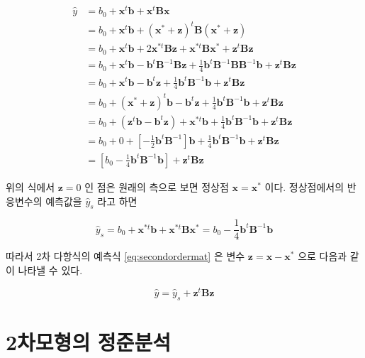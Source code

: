 \documentclass[
]{book}
\newcommand{\bm}[1]{\boldsymbol{\mathbf{#1}}}
\theoremstyle{definition}
\theoremstyle{definition}
\theoremstyle{definition}
\theoremstyle{definition}
\theoremstyle{remark}
\begin{document}
\begin{align*}
\hat y  & =   b_0 + {\bm x}^t \bm b + {\bm x}^t \bm B {\bm x}  \\
  & =  b_0  + {\bm x}^t \bm b +  ({\bm x}^* + \bm z )^t \bm B ({\bm x}^* + \bm z ) \\
  & =  b_0  + {\bm x}^t \bm b + 2 {\bm x}^{*t}  \bm B  \bm z  + {\bm x}^{*t}  \bm B {\bm x}^{*} +  {\bm z}^t \bm B  {\bm z} \\
   & =  b_0  + {\bm x}^t \bm b - {\bm b}^t  {\bm B}^{-1}  \bm B  \bm z  +\frac{1}{4} {\bm b}^t  {\bm B}^{-1} \bm B {\bm B}^{-1} {\bm b} +  {\bm z}^t \bm B  {\bm z} \\
   & = b_0  + {\bm x}^t \bm b  - {\bm b}^t  \bm z +\frac{1}{4}  {\bm b}^t {\bm B}^{-1}{\bm b} +  {\bm z}^t \bm B  {\bm z} \\
   & = b_0  + ({\bm x}^* + \bm z)^t \bm b  - {\bm b}^t  \bm z +\frac{1}{4}  {\bm b}^t {\bm B}^{-1}{\bm b} +  {\bm z}^t \bm B  {\bm z} \\
   & = b_0 + ( {\bm z}^t \bm b - {\bm b}^t  \bm z) + {\bm x}^{*t} \bm b  +\frac{1}{4}  {\bm b}^t {\bm B}^{-1}{\bm b} +  {\bm z}^t \bm B  {\bm z} \\
  & = b_0 + 0  + \left [ - \frac{1}{2}   {\bm b}^t  {\bm B}^{-1} \right ] {\bm b} +\frac{1}{4}  {\bm b}^t {\bm B}^{-1}{\bm b} +  {\bm z}^t \bm B  {\bm z} \\
  & =  \left [ b_0 - \frac{1}{4} {\bm b}^t {\bm B}^{-1}{\bm b}  \right ] +  {\bm z}^t \bm B  {\bm z} 
\label{eq:statval}
\end{align*}

위의 식에서 \(\bm z= 0\) 인 점은 원래의 측으로 보면 정상점 \(\bm x ={\bm x}^*\) 이다. 정상점에서의 반응변수의 예측값을 \(\hat y_s\) 라고 하면

\[ \hat y_s =   b_0 + {\bm x}^{*t} \bm b + {\bm x}^{*t} \bm B {\bm x}^* =  b_0 - \frac{1}{4} {\bm b}^t {\bm B}^{-1}{\bm b} \]

따라서 2차 다항식의 예측식 \eqref{eq:secondordermat} 은 변수 \(\bm z = \bm x - {\bm x}^*\) 으로 다음과 같이 나타낼 수 있다.

\begin{equation}
\hat y = \hat y_s +   {\bm z}^t \bm B  {\bm z} 
\label{eq:secondorderpred}
\end{equation}

\hypertarget{canonocal}{%
\chapter{2차모형의 정준분석}\label{canonocal}}
\end{document}
